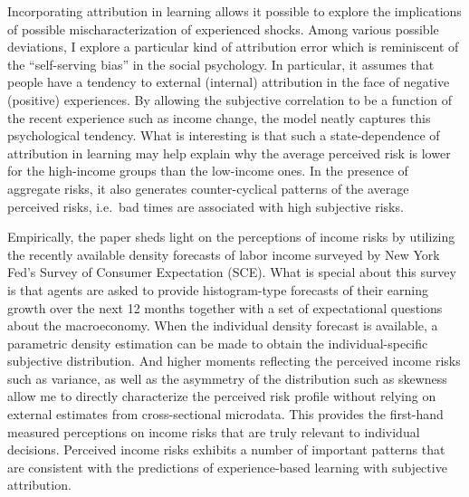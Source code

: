 \documentclass[12pt,notitlepage,onecolumn,aps,pra]{article}
\begin{document}
Incorporating attribution in learning allows it possible to explore the
implications of possible mischaracterization of experienced shocks.
Among various possible deviations, I explore a particular kind of
attribution error which is reminiscent of the ``self-serving bias'' in
the social psychology. In particular, it assumes that people have a
tendency to external (internal) attribution in the face of negative
(positive) experiences. By allowing the subjective correlation to be a
function of the recent experience such as income change, the model
neatly captures this psychological tendency. What is interesting is that
such a state-dependence of attribution in learning may help explain why
the average perceived risk is lower for the high-income groups than the
low-income ones. In the presence of aggregate risks, it also generates
counter-cyclical patterns of the average perceived risks, i.e.~bad times
are associated with high subjective risks.

Empirically, the paper sheds light on the perceptions of income risks by
utilizing the recently available density forecasts of labor income
surveyed by New York Fed's Survey of Consumer Expectation (SCE). What is
special about this survey is that agents are asked to provide
histogram-type forecasts of their earning growth over the next 12 months
together with a set of expectational questions about the macroeconomy.
When the individual density forecast is available, a parametric density
estimation can be made to obtain the individual-specific subjective
distribution. And higher moments reflecting the perceived income risks
such as variance, as well as the asymmetry of the distribution such as
skewness allow me to directly characterize the perceived risk profile
without relying on external estimates from cross-sectional microdata.
This provides the first-hand measured perceptions on income risks that
are truly relevant to individual decisions. Perceived income risks
exhibits a number of important patterns that are consistent with the
predictions of experience-based learning with subjective attribution.
\end{document}

